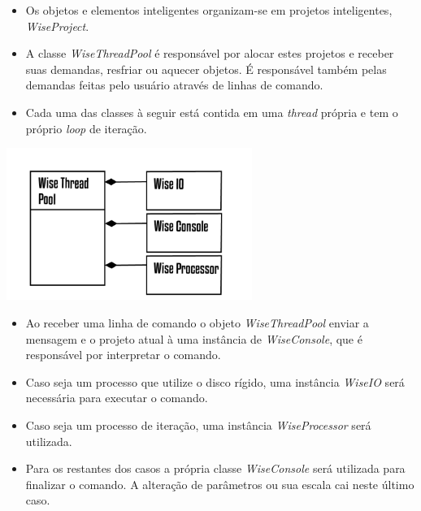 \documentclass[10pt]{beamer}
\theoremstyle{remark}
\theoremstyle{definition}
\begin{document}
\begin{frame}[allowframebreaks]
		\framebreak
		
		\begin{itemize}
			\item Os objetos e elementos inteligentes organizam-se em projetos inteligentes, \textit{WiseProject}.
			\item A classe \textit{WiseThreadPool} é responsável por alocar estes projetos e receber suas demandas, resfriar ou aquecer objetos. É responsável também pelas demandas feitas pelo usuário através de linhas de comando.
		\end{itemize}
		
		\framebreak
		
	\begin{itemize}
			\item Cada uma das classes à seguir está contida em uma \textit{thread} própria e tem o próprio \textit{loop} de iteração.
		\end{itemize}		
		
		\begin{center}
			
			\item \includegraphics[width=0.6\textwidth]{images/WiseThreadPool2.png}
			
		\end{center}
		
		\framebreak

	\begin{itemize}
			\item Ao receber uma linha de comando o objeto \textit{WiseThreadPool} enviar a mensagem e o projeto atual à uma instância de \textit{WiseConsole}, que é responsável por interpretar o comando.
			\item Caso seja um processo que utilize o disco rígido, uma instância \textit{WiseIO} será necessária para executar o comando. 
			\item Caso seja um processo de iteração, uma instância \textit{WiseProcessor} será utilizada.
			\item Para os restantes dos casos a própria classe \textit{WiseConsole} será utilizada para finalizar o comando. A alteração de parâmetros ou sua escala cai neste último caso.
		\end{itemize}		
		

\end{frame}
\end{document}
